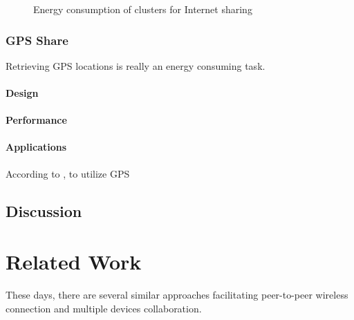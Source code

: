 \documentclass[conference]{IEEEtran}
\begin{document}
\begin{figure}[H]
	\hspace*{0cm}
	\caption{Energy consumption of clusters for Internet sharing}
	\label{fig:net_cluster_energy}
\end{figure}

\subsubsection{GPS Share}
Retrieving GPS locations is really an energy consuming task. 

\paragraph{Design}
\paragraph{Performance}

\paragraph{Applications}
According to \cite{rio}, to utilize GPS

\subsection{Discussion}

\section{Related Work}
\label{sec:related}
These days, there are several similar approaches facilitating peer-to-peer wireless connection and multiple devices collaboration. 
\end{document}
